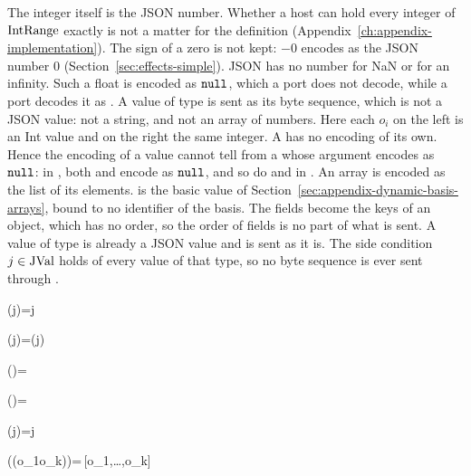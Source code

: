 \begin{rulecomments}
 The integer itself is the JSON number. Whether a host
can hold every integer of $\mathrm{IntRange}$ exactly is not a matter for the
definition (Appendix~\ref{ch:appendix-implementation}). %
 The sign of a zero is not kept: $-0$ encodes as the
JSON number $0$ (Section~\ref{sec:effects-simple}). %
 JSON has no number for NaN or for an infinity.
Such a float is encoded as $\mathtt{null}$, which a  port does not
decode, while a  port decodes it as . %
 A value of type  is sent as its byte
sequence, which is not a JSON value: not a string, and not an array of
numbers. Here each $o_i$ on the left is an Int value and on the right the
same integer. %
 A  has no encoding of its own. Hence the
encoding of a  value cannot tell  from a 
whose argument encodes as $\mathtt{null}$: in , both
 and  encode as $\mathtt{null}$, and so do
 and  in .
 An array is encoded as the list of its elements.
 is the basic value of
Section~\ref{sec:appendix-dynamic-basis-arrays}, bound to no identifier of the
basis.
 The fields become the keys of an object, which has
no order, so the order of fields is no part of what is sent. %
 A value of type  is already a
JSON value and is sent as it is. The side condition $j\in\mathrm{JVal}$ holds of every
value of that type, so no byte sequence is ever sent through
. %
\end{rulecomments}


  {\Dec{\tInt}(j)=j}

  {\Dec{\tFloat}(j)=\efffloat(j)}

  {\Dec{\tBool}(\efftrue)=}

  {\Dec{\tBool}(\efffalse)=}

  {\Dec{\tString}(j)=j}

  {\Dec{\tBytes}(\effbytes(o_1\cdots o_k))=\dbbin\,[o_1,\ldots,o_k]}

